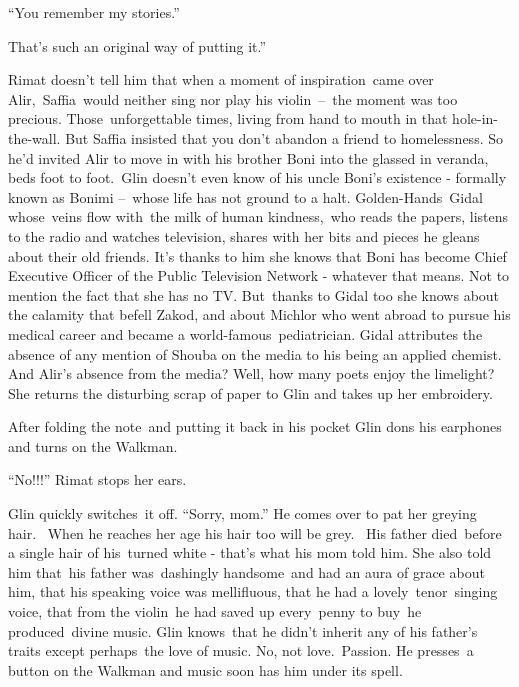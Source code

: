 \documentclass[letterpaper]{article}
\begin{document}
\textcolor[rgb]{0.13333334,0.13333334,0.13333334}{{}``You remember my stories.'' }

\textcolor[rgb]{0.13333334,0.13333334,0.13333334}{{\textquotedbl}That's such an original way of putting it.''}

\textcolor[rgb]{0.13333334,0.13333334,0.13333334}{Rimat doesn{}'t tell him that when a moment of inspiration~came over
Alir,~Saffia~would neither sing nor play his violin\ {}--\ the moment was too precious. Those~unforgettable times,
living from hand to mouth in that hole-in-the-wall. But Saffia insisted that you don't abandon a friend to
homelessness. So} he{}'d invited Alir to move in with his brother Boni into the glassed in veranda, beds foot to
foot.\ Glin doesn't even know of his uncle Boni{}'s existence - formally known as Bonimi --\ whose life has not ground
to a halt. Golden-Hands\ Gidal whose\ veins flow with\ the milk of human kindness,~who reads the papers, listens to the
radio and watches television, shares with her bits and pieces he gleans about their old friends. It's thanks to him she
knows that Boni has become Chief Executive Officer of the Public Television Network - whatever that means. Not to
mention the fact that she has no TV. But~thanks to Gidal too she knows about the calamity that befell Zakod, and about
Michlor who went abroad to pursue his medical career and became a world-famous\ pediatrician. Gidal attributes the
absence of any mention of Shouba on the media to his being an applied chemist. And Alir's absence from the media? Well,
how many poets enjoy the limelight? She returns the disturbing scr\textcolor[rgb]{0.13333334,0.13333334,0.13333334}{ap
of paper to Glin and takes up her embroidery.}

\textcolor[rgb]{0.13333334,0.13333334,0.13333334}{After folding the
}note\textcolor[rgb]{0.0,0.4392157,0.7529412}{\ }\textcolor[rgb]{0.13333334,0.13333334,0.13333334}{and putting it back
in his pocket Glin dons his earphones and turns on the Walkman. }

\textcolor[rgb]{0.13333334,0.13333334,0.13333334}{{}``No!!!'' Rimat stops her ears. }

\textcolor[rgb]{0.13333334,0.13333334,0.13333334}{Glin }quickly
switches\ \textcolor[rgb]{0.13333334,0.13333334,0.13333334}{it off. ``Sorry, mom.'' }He comes over to pat her greying
hair.~ When he reaches her age his hair too will be grey.~ His father died~before a single hair of his\ turned white -
that's what his mom told him.  She also told him that\textcolor{red}{\ }his father was\ dashingly handsome\ and had an
aura of grace about him, that his speaking voice was mellifluous, that he had a lovely\ tenor\ singing voice, that from
the violin~he had saved up every\ penny to buy\ he produced\ divine music. Glin knows~that
\textcolor[rgb]{0.13333334,0.13333334,0.13333334}{he didn{}'t inherit any of his father's traits except perhaps\ the
love of music. No, not love.~Passion. He }presses\ \textcolor[rgb]{0.13333334,0.13333334,0.13333334}{a button on the
Walkman and }music soon has him under its spell.~ 
\end{document}

